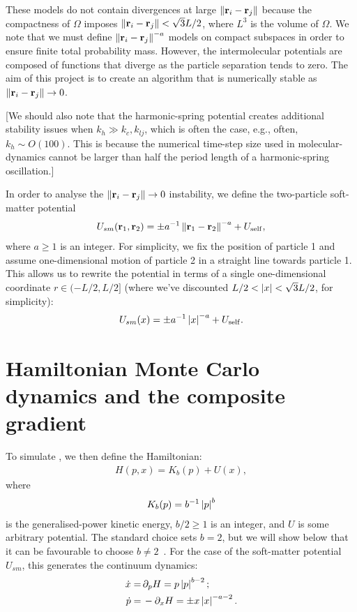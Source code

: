 \documentclass[a4paper]{article}
\begin{document}
These models do not contain divergences at large $\left\lVert \mathbf{r}_i - \mathbf{r}_j \right\rVert$ because the compactness of $\Omega$ imposes $\left\lVert \mathbf{r}_i - \mathbf{r}_j \right\rVert < \sqrt{3} L / 2$, where $L^3$ is the volume of $\Omega$. We note that we must define $\left\lVert \mathbf{r}_i - \mathbf{r}_j \right\rVert^{-a}$ models on compact subspaces in order to ensure finite total probability mass. However, the intermolecular potentials are composed of functions that diverge as the particle separation tends to zero. The aim of this project is to create an algorithm that is numerically stable as $\left\lVert \mathbf{r}_i - \mathbf{r}_j \right\rVert \to 0$. 

[We should also note that the harmonic-spring potential creates additional stability issues when $k_h \gg k_c, k_{lj}$, which is often the case, e.g., often, $k_h \sim O(100)$. This is because the numerical time-step size used in molecular-dynamics cannot be larger than half the period length of a harmonic-spring oscillation.]

In order to analyse the $\left\lVert \mathbf{r}_i - \mathbf{r}_j \right\rVert \to 0$ instability, we define the two-particle soft-matter potential
\begin{align}
U_{sm}(\mathbf{r}_1, \mathbf{r}_2) = \pm a^{-1} \left\lVert \mathbf{r}_1 - \mathbf{r}_2 \right\rVert^{-a} + U_{\rm{self}} ,
\end{align}
where $a \ge 1$ is an integer. 
For simplicity, we fix the position of particle 1 and assume one-dimensional motion of particle 2 in a straight line towards particle 1. This allows us to rewrite the potential in terms of a single one-dimensional coordinate $r \in (-L / 2, L / 2]$ (where we've discounted $L / 2 < \left| x \right| < \sqrt{3}L / 2$, for simplicity):
\begin{align}
U_{sm}(x) = \pm a^{-1} \left| x \right|^{-a} + U_{\rm{self}} .
\end{align}


\section{Hamiltonian Monte Carlo dynamics and the composite gradient}

To simulate \HMC , we then define the Hamiltonian:
\begin{align}
H(p, x) = K_b(p) + U(x) ,
\end{align}
where
\begin{align}
K_b(p) = b^{-1} \left| p \right|^{b} 
\end{align}
is the generalised-power kinetic energy, $b / 2 \ge 1$ is an integer, and $U$ is some arbitrary potential. The standard choice sets $b = 2$, but we will show below that it can be favourable to choose $b \ne 2$~\cite{Livingstone2019Kinetic}. For the case of the soft-matter potential $U_{sm}$, this generates the continuum dynamics: 
\begin{align} \label{eq:HamiltonianDynamics}
\dot{x} =& \, \partial_p H = p \left| p \right|^{b - 2} ; \\
\dot{p} =& \, - \partial_x H = \pm x \left| x \right|^{- a - 2} .
\end{align}
\end{document}
